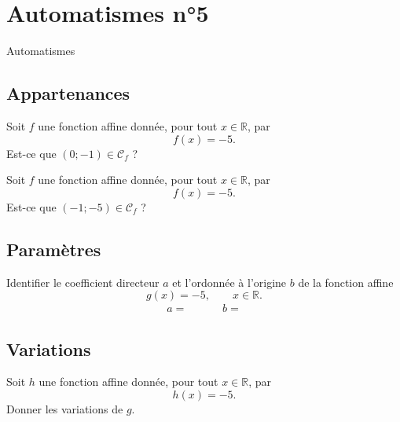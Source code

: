 \documentclass[14pt]{beamer}
\newcommand{\R}{\mathbb{R}}
\begin{document}
\section{Automatismes n°5}

\begin{frame}

\centering \huge
Automatismes

\end{frame}

\subsection{Appartenances}

\begin{frame}{1}

	Soit $f$ une fonction affine donnée, pour tout $x\in\R$, par
		\[ f(x) = - 5. \]
	Est-ce que $(0;-1) \in \mathcal{C}_f$ ?
\end{frame}


\begin{frame}{2}
	Soit $f$ une fonction affine donnée, pour tout $x\in\R$, par
		\[ f(x) =  -5. \]
	Est-ce que $(-1;-5) \in \mathcal{C}_f$ ?
\end{frame}

\subsection{Paramètres}

\begin{frame}{3}
    Identifier le coefficient directeur $a$ et l'ordonnée à l'origine $b$ de la fonction affine
		\[ g(x) = -5, \qquad x \in \R. \]
    \begin{align*}
        a = && && b=
    \end{align*}
\end{frame}

\subsection{Variations}

\begin{frame}{4}

	Soit $h$ une fonction affine donnée, pour tout $x\in\R$, par
		\[ h(x) = -5. \]
	Donner les variations de $g$.

\end{frame}
\end{document}
